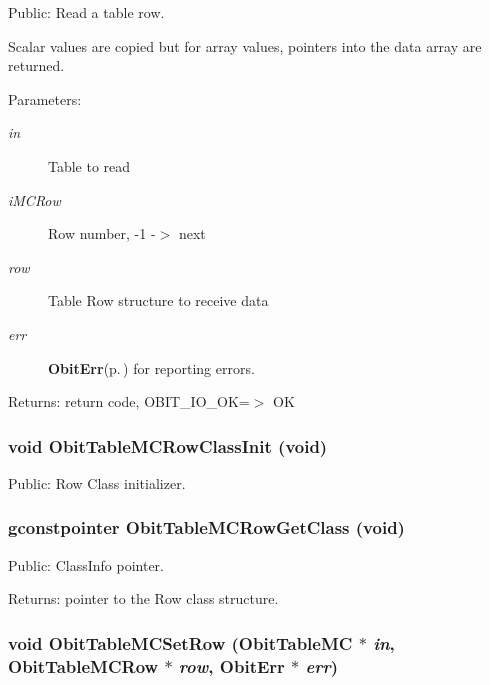 Public: Read a table row. 

Scalar values are copied but for array values, pointers into the data array are returned. \begin{Desc}
\item[Parameters:]
\begin{description}
\item[{\em in}]Table to read \item[{\em i\-MCRow}]Row number, -1 -$>$ next \item[{\em row}]Table Row structure to receive data \item[{\em err}]{\bf Obit\-Err}{\rm (p.\,\pageref{structObitErr})} for reporting errors. \end{description}
\end{Desc}
\begin{Desc}
\item[Returns:]return code, OBIT\_\-IO\_\-OK=$>$ OK \end{Desc}
\subsubsection{\setlength{\rightskip}{0pt plus 5cm}void Obit\-Table\-MCRow\-Class\-Init (void)}\label{ObitTableMC_8h_a7}


Public: Row Class initializer. 

\subsubsection{\setlength{\rightskip}{0pt plus 5cm}gconstpointer Obit\-Table\-MCRow\-Get\-Class (void)}\label{ObitTableMC_8h_a9}


Public: Class\-Info pointer. 

\begin{Desc}
\item[Returns:]pointer to the Row class structure. \end{Desc}
\subsubsection{\setlength{\rightskip}{0pt plus 5cm}void Obit\-Table\-MCSet\-Row ({\bf Obit\-Table\-MC} $\ast$ {\em in}, {\bf Obit\-Table\-MCRow} $\ast$ {\em row}, {\bf Obit\-Err} $\ast$ {\em err})}\label{ObitTableMC_8h_a19}


